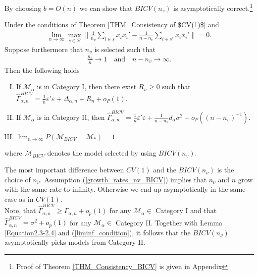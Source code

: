 \documentclass[Research_Module_ES.tex]{subfiles}
\begin{document}
By choosing $b=O(n)$ we can show that $BICV(n_v)$ is asymptotically correct.\footnote{Proof of Theorem \ref{THM_Consistency_BICV} is given in Appendix }
\begin{thm}
	\label{THM_Consistency_BICV}
Under the conditions of Theorem \ref{THM_Consistency of $CV(1)$} and
\begin{align}
\lim_{n\to\infty} \max_{s\in \mathcal{B}}\biggl\lVert \frac{1}{n_v}\sum_{i\in s}x_ix_i' - \frac{1}{n-n_v}\sum_{i\in s^c}x_ix_i'\biggr\rVert =0. \label{gram_matrix_condition_BICV}
\end{align}
Suppose furthermore that $n_v$ is selected such that
\begin{align}
\frac{n_v}{n}\to 1 \quad \textrm{and} \quad n-n_v \to \infty. \label{growth_rates_nv_BICV}
\end{align}
Then the following holds
\begin{enumerate}[(I)]
\item If $\mathcal{M}_\alpha$ is in Category I, then there exist $R_n \ge 0$ such that $\hat{\Gamma}_{\alpha,n}^{BICV} = \frac{1}{n}\varepsilon'\varepsilon + \Delta_{\alpha,n} + R_n + o_P(1)$.
\item If $\mathcal{M}_\alpha$ is in Category II, then $\hat{\Gamma}_{\alpha,n}^{BICV} = \frac{1}{n}\varepsilon'\varepsilon + \frac{1}{n-n_v}d_\alpha\sigma^2  + o_P((n-n_v)^{-1})$.
\item $\lim_{n\to\infty}P(\mathcal{M}_{BICV}=\mathcal{M}_\ast) = 1$
\end{enumerate}
where $\mathcal{M}_{BICV}$ denotes the model selected by using $BICV(n_v)$.
\end{thm}
The most important difference between $CV(1)$ and the $BICV(n_\nu)$ is the choice of $n_\nu$. Assumption (\ref{growth_rates_nv_BICV}) implies that $n_\nu$ and $n$ grow with the same rate to infinity. Otherwise we end up asymptotically in the same case as in $CV(1)$.\\

Note, that $\hat{\Gamma}_{\alpha,n}^{BICV}\geq\Gamma_{\alpha,n}+o_p(1)$ for any $\mathcal{M}_\alpha\in$ Category I and that $\hat{\Gamma}_{\alpha,n}^{BICV}=\sigma^2+o_p(1)$ for any $\mathcal{M}_\alpha\in$ Category II. Together with Lemma \ref{Equation2.3-2.4} and (\ref{liminf_condition}), it follows that the $BICV(n_\nu)$ asymptotically picks models from Category II.\\
\end{document}
